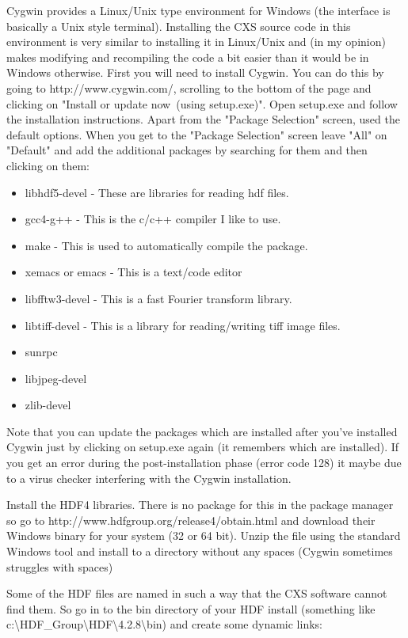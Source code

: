 \documentclass[]{cxs-software}
\begin{document}
Cygwin\cite{} provides a Linux/Unix type environment for Windows (the
interface is basically a Unix style terminal). Installing the CXS
source code in this environment is very similar to installing it in
Linux/Unix and (in my opinion) makes modifying and recompiling the
code a bit easier than it would be in Windows otherwise. First you
will need to install Cygwin. You can do this by going to
http://www.cygwin.com/, scrolling to the bottom of the page and
clicking on "Install or update now\ (using setup.exe)". Open setup.exe
and follow the installation instructions. Apart from the "Package
Selection" screen, used the default options. When you get to the
"Package Selection" screen leave "All" on "Default" and add the
additional packages by searching for them and then clicking on them:
\begin{itemize}
\item libhdf5-devel - These are libraries for reading hdf files.
\item gcc4-g++ - This is the c/c++ compiler I like to use.
\item make - This is used to automatically compile the package.
\item xemacs or emacs - This is a text/code editor
\item libfftw3-devel - This is a fast Fourier transform library.
\item libtiff-devel - This is a library for reading/writing tiff image files.
\item sunrpc
\item libjpeg-devel
\item zlib-devel
\end{itemize}

Note that you can update the packages which are installed after you've
installed Cygwin just by clicking on setup.exe again (it remembers
which are installed). If you get an error during the post-installation
phase (error code 128) it maybe due to a virus checker interfering
with the Cygwin installation.

Install the HDF4 libraries. There is no package for this in the
package manager so go to http://www.hdfgroup.org/release4/obtain.html
and download their Windows binary for your system (32 or 64 bit). 
Unzip the file using the standard Windows tool and install to a directory 
without any spaces (Cygwin sometimes struggles with spaces)

Some of the HDF files are named in such a way that the CXS software cannot 
find them. So go in to the bin directory of your HDF install (something like 
c:\textbackslash{}HDF\_Group\textbackslash{}HDF\textbackslash{}4.2.8\textbackslash{}bin)
and create some dynamic links:
\end{document}
